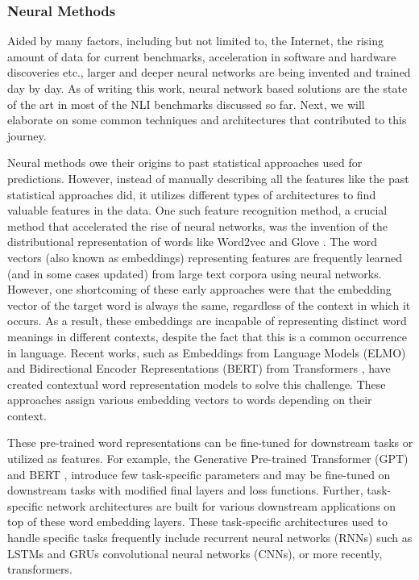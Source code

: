 \subsubsection{Neural Methods}
\label{rte_methods_neural}
 Aided by many factors, including but not limited to, the Internet, the rising amount of data for current benchmarks, acceleration in software and hardware discoveries etc., larger and deeper neural networks are being invented and trained day by day. As of writing this work, neural network based solutions are the state of the art in most of the NLI benchmarks discussed so far. Next, we will elaborate on some common techniques and architectures that contributed to this journey.
 
 
 
Neural methods owe their origins to past statistical approaches used for predictions. However, instead of manually describing all the features like the past statistical approaches did, it utilizes different types of architectures to find valuable features in the data. One such feature recognition method, a crucial method that accelerated the rise of neural networks, was the invention of the distributional representation of words like Word2vec \citep{mikolov2017advances} and Glove \citep{pennington2014glove}. The word vectors (also known as embeddings) representing features are frequently learned (and in some cases updated) from large text corpora using neural networks. However, one shortcoming of these early approaches were that the embedding vector of the target word is always the same, regardless of the context in which it occurs. As a result, these embeddings are incapable of representing distinct word meanings in different contexts, despite the fact that this is a common occurrence in language. Recent works, such as Embeddings from Language Models (ELMO)\citep{peters2018deep} and Bidirectional Encoder Representations (BERT) \citep{devlin2018bert} from Transformers \citep{vaswani2017attention}, have created contextual word representation models to solve this challenge. These approaches assign various embedding vectors to words depending on their context. 


These pre-trained word representations can be fine-tuned for downstream tasks or utilized as features. For example, the Generative Pre-trained Transformer (GPT) \citep{radford2018improving} and BERT  \citep{devlin2018bert}, introduce few task-specific parameters and may be fine-tuned on downstream tasks with modified final layers and loss functions. Further, task-specific network architectures are built for various downstream applications on top of these word embedding layers. These task-specific architectures used to handle specific tasks frequently include recurrent neural networks (RNNs) such as LSTMs \citep{hochreiter1997long} and GRUs \citep{cho2014properties} convolutional neural networks (CNNs), or more recently, transformers\citep{vaswani2017attention}.

